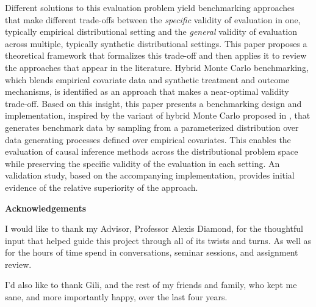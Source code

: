 \documentclass[../main.tex]{subfiles}
\begin{document}
    \vspace{\baselineskip}

    Different solutions to this evaluation problem yield benchmarking approaches that make different trade-offs between the \textit{specific} validity of evaluation in one, typically empirical distributional setting and the \textit{general} validity of evaluation across multiple, typically synthetic distributional settings. This paper proposes a theoretical framework that formalizes this trade-off and then applies it to review the approaches that appear in the literature. Hybrid Monte Carlo benchmarking, which blends empirical covariate data and synthetic treatment and outcome mechanisms, is identified as an approach that makes a near-optimal validity trade-off. Based on this insight, this paper presents a benchmarking design and implementation, inspired by the variant of hybrid Monte Carlo proposed in \textcite{Dorie2019Automated1}, that generates benchmark data by sampling from a parameterized distribution over data generating processes defined over empirical covariates. This enables the evaluation of causal inference methods across the distributional problem space while preserving the specific validity of the evaluation in each setting. An validation study, based on the accompanying implementation, provides initial evidence of the relative superiority of the approach.
    
    \newpage
    
    \thispagestyle{plain}
    \Large
    \textbf{Acknowledgements}
    \vspace{1cm}
    
    \normalsize
    I would like to thank my Advisor, Professor Alexis Diamond, for the thoughtful input that helped guide this project through all of its twists and turns. As well as for the hours of time spend in conversations, seminar sessions, and assignment review.
    
    \vspace{\baselineskip}
    
    I'd also like to thank Gili, and the rest of my friends and family, who kept me sane, and more importantly happy, over the last four years.
    
\end{document}

